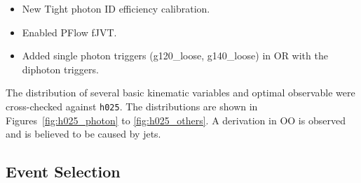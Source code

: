 \begin{itemize}
  \item New Tight photon ID efficiency calibration. 
  \item Enabled PFlow fJVT. 
  \item Added single photon triggers (g120\_loose, g140\_loose) in OR with the diphoton triggers. 
\end{itemize}  

The distribution of several basic kinematic variables and optimal observable were cross-checked against \texttt{h025}. The distributions are shown in Figures~\ref{fig:h025_photon} to \ref{fig:h025_others}. A derivation in OO is observed and is believed to be caused by jets.  




\FloatBarrier

\subsection{Event Selection}
\label{ssec:event_selection}

